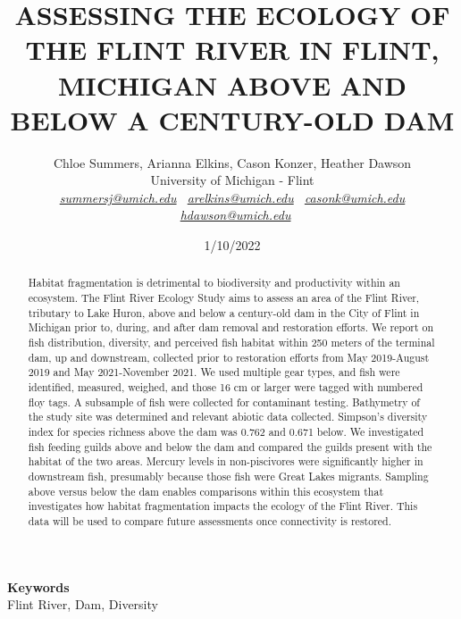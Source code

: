 \documentclass[a4paper, 12pt]{article} %
\date{1/10/2022} %
\def\keywords#1{\begin{center}{\bf Keywords}\\{#1}\end{center}} %
\begin{document}
\title{ASSESSING THE ECOLOGY OF THE FLINT RIVER IN FLINT, MICHIGAN ABOVE AND BELOW A CENTURY-OLD DAM}

\vspace{0.5cm}
\author{Chloe Summers, Arianna Elkins, Cason Konzer, Heather Dawson  \\ %
       University of Michigan - Flint \\ %
       \textit{ \color{violet}
       \href{mailto:summersj@umich.edu}{summersj@umich.edu} \ \href{mailto:arelkins@umich.edu}{arelkins@umich.edu} \ \href{mailto:casonk@umich.edu}{casonk@umich.edu} \ \href{mailto:hdawson@umich.edu}{hdawson@umich.edu}}  %
       }%

\maketitle

\thispagestyle{empty}


\begin{abstract}
\vspace{0.5cm}

       Habitat fragmentation is detrimental to biodiversity and productivity within an ecosystem. 
The Flint River Ecology Study aims to assess an area of the Flint River, tributary to Lake Huron, 
above and below a century-old dam in the City of Flint in Michigan prior to, during, and after dam removal and restoration efforts. 
We report on fish distribution, diversity, and perceived fish habitat within 250 meters of the terminal dam, up and downstream, 
collected prior to restoration efforts from May 2019-August 2019 and May 2021-November 2021. 
We used multiple gear types, and fish were identified, measured, weighed, and those 16 cm or larger were tagged with numbered floy tags. 
A subsample of fish were collected for contaminant testing. 
Bathymetry of the study site was determined and relevant abiotic data collected. 
Simpson’s diversity index for species richness above the dam was 0.762 and 0.671 below. 
We investigated fish feeding guilds above and below the dam and compared the guilds present with the habitat of the two areas. 
Mercury levels in non-piscivores were significantly higher in downstream fish, presumably because those fish were Great Lakes migrants. 
Sampling above versus below the dam enables comparisons within this ecosystem that investigates how habitat fragmentation impacts the ecology of the Flint River. 
This data will be used to compare future assessments once connectivity is restored.

\vspace{8cm}


\end{abstract}

\keywords{Flint River, Dam, Diversity} %

\end{document}
